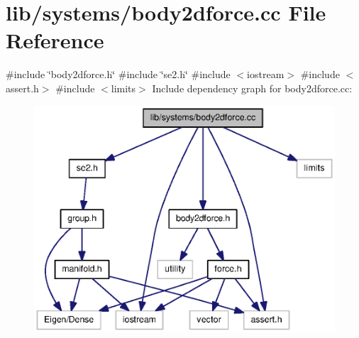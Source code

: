 \section{lib/systems/body2dforce.cc \-File \-Reference}
\label{body2dforce_8cc}
{\ttfamily \#include \char`\"{}body2dforce.\-h\char`\"{}}\*
{\ttfamily \#include \char`\"{}se2.\-h\char`\"{}}\*
{\ttfamily \#include $<$iostream$>$}\*
{\ttfamily \#include $<$assert.\-h$>$}\*
{\ttfamily \#include $<$limits$>$}\*
\-Include dependency graph for body2dforce.\-cc\-:
\nopagebreak
\begin{figure}[H]
\begin{center}
\leavevmode
\includegraphics[width=350pt]{body2dforce_8cc__incl}
\end{center}
\end{figure}
